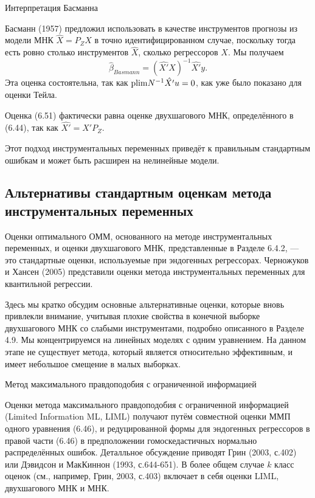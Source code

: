 \begin{center}
Интерпретация Басманна
\end{center}

Басманн (1957) предложил использовать в качестве инструментов прогнозы из модели МНК  $\hat{X}=P_{Z} X$  в  точно идентифицированном случае, поскольку тогда есть ровно столько инструментов $\hat{X}$, сколько регрессоров $X$. Мы получаем
\begin{equation}
\hat{\beta}_{Basmann}=(\hat{X'} X)^{-1} \hat{X'} y.
\end{equation}
Эта оценка состоятельна, так как $\mathrm{plim } N^{-1} \hat{X'} u =0$, как уже было показано для оценки Тейла. 

Оценка (6.51) фактически равна оценке двухшагового МНК, определённого в (6.44), так как $\hat{X'}=X' P_{Z}$.

Этот подход инструментальных переменных приведёт к правильным стандартным ошибкам и может быть расширен на нелинейные модели.

\subsection{Альтернативы стандартным оценкам метода инструментальных переменных}

Оценки оптимального ОММ, основанного на методе инструментальных переменных, и оценки двухшагового МНК, представленные в Разделе 6.4.2, --- это стандартные оценки, используемые при эндогенных регрессорах. Черножуков и Хансен (2005) представили оценки метода инструментальных переменных для квантильной регрессии.

Здесь мы кратко обсудим основные альтернативные оценки, которые вновь привлекли внимание, учитывая плохие свойства в конечной выборке двухшагового МНК со слабыми инструментами, подробно описанного в Разделе 4.9. Мы концентрируемся на линейных моделях с одним уравнением. На данном этапе не существует метода, который является относительно эффективным, и имеет небольшое смещение в малых выборках.

\begin{center}
Метод максимального правдоподобия с ограниченной информацией
\end{center}

Оценки метода максимального правдоподобия с ограниченной информацией (Limited Information ML, LIML) получают путём совместной оценки ММП одного уравнения (6.46), и редуцированной формы для эндогенных регрессоров в правой части (6.46) в предположении гомоскедастичных нормально распределённых ошибок. Деталльное обсуждение приводят Грин (2003, с.402) или Дэвидсон и МакКиннон (1993, с.644-651). В более общем случае $k$ класс оценок  (см., например, Грин, 2003, с.403) включает в себя оценки LIML, двухшагового МНК и МНК.

